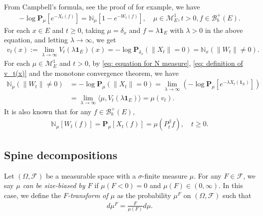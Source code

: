 \documentclass[12pt,a4paper]{amsart}
\theoremstyle{definition}
\numberwithin{equation}{section}
\begin{document}
From  Campbell's formula, see  the proof of \cite[Theorem 2.7]{Kyprianou2014Fluctuations} for example, we have
\begin{align} \label{eq: equation for N measure}
	- \log \mathbf P_\mu [e^{-X_t(f)}]
	= \mathbb N_\mu[ 1-e^{- W_t(f)}],
	\quad \mu \in \mathcal M_E^1, t>0, f\in \mathscr B_b^+(E).
\end{align}
For each $x\in E$ and $t\geq 0$, taking $\mu = \delta_x$ and $f = \lambda \mathbf 1_E$ with $\lambda > 0$ in the above equation, and letting $\lambda \to \infty$, we get
\begin{align} \label{eq: definition of v_t(x)}
	v_t(x)
	:= \lim_{\lambda\to \infty} V_t(\lambda\mathbf 1_E)(x)
	= -\log \mathbf P_{\delta_x} (\|X_t\|=0)
	= \mathbb N_x(\|W_t\|\neq 0).
\end{align}
For each $\mu \in \mathcal M_E^1$ and $t > 0$, by \eqref{eq: equation for N measure}, \eqref{eq: definition of v_t(x)} and the monotone convergence theorem, we have
\begin{align}
  \mathbb N_\mu(\|W_t\|\neq 0)
	&= -\log \mathbf P_{\mu} (\|X_t\|=0)
   = \lim_{\lambda \to \infty} (- \log \mathbf P_\mu [e^{-\lambda X_t(\mathbf 1_E)}])
	\\\label{eq: equation for mu v-t}
	&= \lim_{\lambda \to \infty} \langle \mu, V_t(\lambda \mathbf 1_E)\rangle
   = \mu(v_t).
\end{align}
It is also known that for any $f\in\mathscr B_b^+(E)$,
\begin{align}\label{eq: mean of kuz measure}
  \mathbb N_{\mu}[W_t(f)]
  =\mathbf P_{\mu}[X_t(f)]=\mu(P^\beta_tf),
  \quad t \geq 0.
  \end{align}

\subsection{Spine decompositions}
\label{sec: Spine decompositions}
Let $(\Omega, \mathscr F)$ be a measurable space with a $\sigma$-finite measure $\mu$.
For any $F\in \mathscr F$, we say \emph{$\mu$ can be size-biased by $F$} if $\mu(F< 0) = 0$ and $\mu(F) \in (0,\infty)$.
In this case, we define the \emph{$F$-transform of $\mu$} as the probability $\mu^F$ on $(\Omega, \mathscr F)$ such that
\begin{align}	
	d\mu^F
	= \frac{F}{\mu(F)}d \mu.
\end{align}
\end{document}
